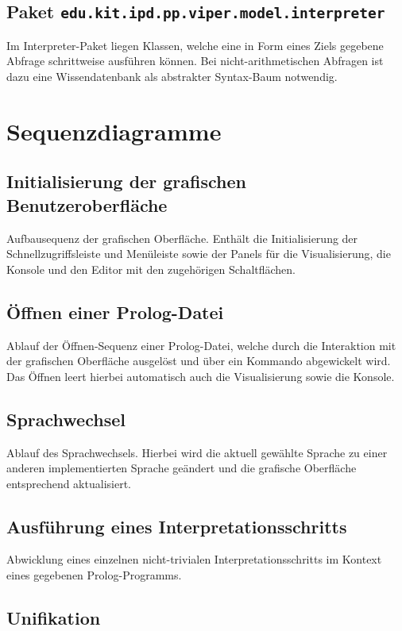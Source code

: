 \documentclass[parskip=full,11pt,twoside]{scrartcl}
\begin{document}
\subsection{Paket \texttt{edu.kit.ipd.pp.viper.model.interpreter}}
Im Interpreter-Paket liegen Klassen, welche eine in Form eines Ziels gegebene Abfrage schrittweise ausführen können. Bei nicht-arithmetischen Abfragen ist dazu eine Wissendatenbank als abstrakter Syntax-Baum notwendig.

\section{Sequenzdiagramme}

\subsection{Initialisierung der grafischen Benutzeroberfläche}
Aufbausequenz der grafischen Oberfläche. Enthält die Initialisierung der Schnellzugriffsleiste und Menüleiste sowie der Panels für die Visualisierung, die Konsole und den Editor mit den zugehörigen Schaltflächen.

\subsection{Öffnen einer Prolog-Datei}
Ablauf der Öffnen-Sequenz einer Prolog-Datei, welche durch die Interaktion mit der grafischen Oberfläche ausgelöst und über ein Kommando abgewickelt wird. Das Öffnen leert hierbei automatisch auch die Visualisierung sowie die Konsole.

\subsection{Sprachwechsel}
Ablauf des Sprachwechsels. Hierbei wird die aktuell gewählte Sprache zu einer anderen implementierten Sprache geändert und die grafische Oberfläche entsprechend aktualisiert.

\subsection{Ausführung eines Interpretationsschritts}
Abwicklung eines einzelnen nicht-trivialen Interpretationsschritts im Kontext eines gegebenen Prolog-Programms.

\subsection{Unifikation}
\end{document}
